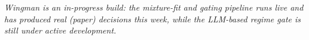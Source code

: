 \documentclass[10pt]{article}
\begin{document}
\vspace{4pt}
\textit{%
Wingman is an in-progress build: the mixture-fit and gating pipeline runs live and
has produced real (paper) decisions this week, while the LLM-based regime gate is
still under active development.}
\end{document}
